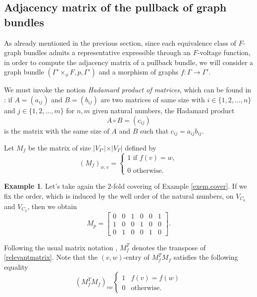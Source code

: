 \documentclass{amsart}
\theoremstyle{definition}
\newtheorem{example}[theo]{Example}
\numberwithin{equation}{section}
\begin{document}
\subsection{Adjacency matrix of the pullback of graph bundles} 
As already mentioned in the previous section, since each equivalence class of $F$-graph bundles admits a representative expressible through an $F$-voltage function, in order to compute the adjacency matrix of a pullback bundle, we will consider a graph bundle $(\Gamma'\times_\phi F, p, \Gamma')$ and a morphism of graphs $f:\Gamma \longrightarrow \Gamma'$.



We must invoke the notion \textit{Hadamard product of matrices}, which can be found in \cite[\S 10.5]{spectrabook}: if $A=(a_{ij})$ and $B=(b_{ij})$ are two matrices of  same size with $i\in \{1, 2, \ldots,n\}$ and $j \in \{1,2, \ldots, m\}$ for $n,m$ given natural numbers,  the Hadamard product \begin{equation}A \circ B = (c_{ij}) \end{equation} is the matrix with the same size of $A$ and $B$ such that $c_{ij} = a_{ij}b_{ij}$. 


Let $M_f$ be the matrix of size $\vert V_{\Gamma'} \vert \times \vert V_{\Gamma}\vert$ defined by
\begin{equation}\label{relevantmatrix}
(M_{f})_{w,v} = \begin{cases}
1 \mbox{ if } f(v) = w,\\
\\
0 \mbox{ otherwise.}
\end{cases}
\end{equation}
\begin{example}
Let's take again the $2$-fold covering of Example \ref{exem.cover}. If we fix the order, which is induced by the well order of the natural numbers, on  $V_{C_6}$ and $V_{C_2}$, then we obtain
\begin{equation}
M_{p} = \begin{bmatrix} 0 & 0& 1& 0 & 0& 1 \\
1 & 0& 0& 1 & 0& 0 \\
0 & 1& 0& 0 & 1& 0
\end{bmatrix}.
\end{equation}
\end{example}


Following the usual matrix notation \cite{spectrabook, crs, gross2},  $M^T_{f}$ denotes the transpose of \eqref{relevantmatrix}. Note that the $(v,w)$-entry of $M^T_fM_f$ satisfies the following equality
\begin{equation}\label{transpose}
    (M^T_fM_f)_{vw}\begin{cases} 1 & f(v)=f(w)\\
    0 &\mbox{otherwise.}
    \end{cases}
\end{equation}
\end{document}
